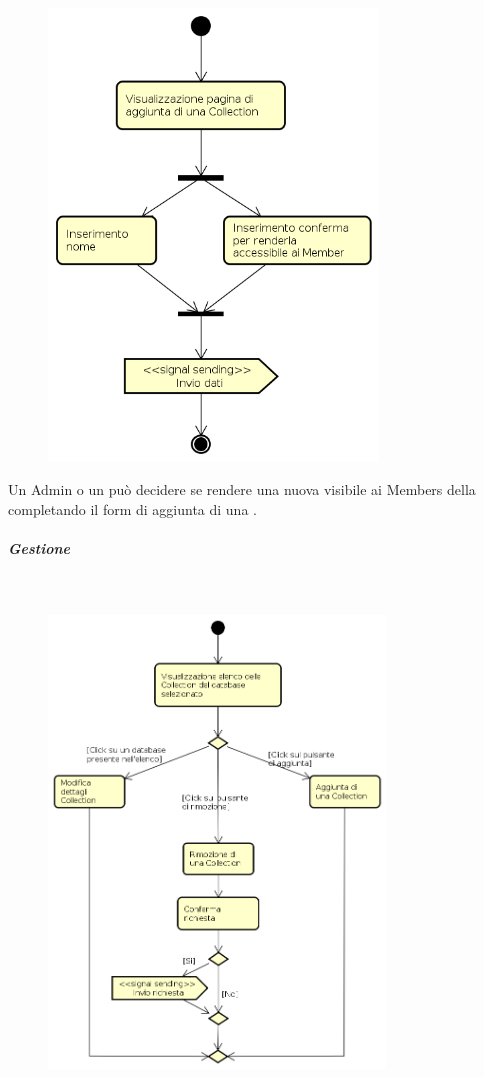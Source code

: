 \begin{figure}[H]
\begin{center}
\includegraphics[height=12cm]{res/sections/backend/activities/aggiuntaDatiCollection.png}
\end{center}
\end{figure}
Un Admin o un  può decidere se rendere una nuova  visibile ai Members della  completando il form di aggiunta di una .
\newpage
\subparagraph{Gestione } \mbox{} \\
\begin{figure}[H]
\begin{center}
\includegraphics[height=12cm]{res/sections/backend/activities/gestioneCollectionAdmin.png}
\end{center}
\end{figure}
